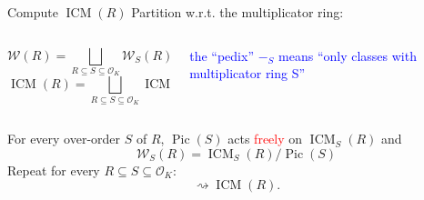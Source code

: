 \documentclass[usenames,dvipsnames,handout]{beamer}
\def\Q{\mathbb{Q}}
\DeclareMathOperator{\ICM}{ICM}
\DeclareMathOperator{\Pic}{Pic}
\newcommand{\cO}{{\mathcal O}}
\newcommand{\cW}{{\mathcal W}}
\newcommand{\red}[1]{\textcolor{red}{#1}}
\begin{document}
\begin{frame}{ Compute $\ICM(R)$ }
\pause Partition w.r.t. the multiplicator ring:
    \begin{columns}
    \begin{column}{0.5\textwidth}
      \[ \cW(R) = \bigsqcup_{R\subseteq S \subseteq \cO_K} \cW_S(R)\]
      \[ \ICM(R) = \bigsqcup_{R\subseteq S \subseteq \cO_K} \ICM_S(R)\]
    \end{column}
\pause
    \begin{column}{0.5\textwidth}  %
	\begin{center}
	\textcolor{blue}{\parbox{10em}{the ``pedix'' $-_S$ means ``only classes with multiplicator ring S''}} 
	\end{center}
    \end{column}
    \end{columns}
\pause
   \begin{theorem}[M.]
    For every over-order $S$ of $R$, $\Pic(S)$ acts \red{freely} on $\ICM_S(R)$ and
    \[ \cW_S(R) = \ICM_S(R) / \Pic(S) \]
\pause Repeat for every $R\subseteq S \subseteq \cO_K$:
    \[ \rightsquigarrow \ICM(R).\]
   \end{theorem}
\end{frame}

% 
\end{document}
